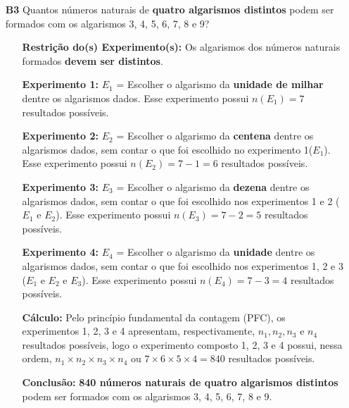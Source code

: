 \documentclass[a4paper,12pt]{article}
\begin{document}
\begin{enumerate}
\item[\textbf{B3}] Quantos números naturais de \textbf{quatro algarismos distintos} podem ser formados com os algarismos 3, 4, 5, 6, 7, 8 e 9?
 \begin{itemize}
     \item[\ding{172}] \textbf{Restrição do(s) Experimento(s):} Os algarismos dos números naturais formados \textbf{devem ser distintos}.
     \item[\ding{173}] \textbf{Experimento 1:} $E_1$ = Escolher o algarismo da \textbf{unidade de milhar} dentre os algarismos dados. Esse experimento possui $n(E_1) = 7$ resultados possíveis.
     \item[\ding{174}] \textbf{Experimento 2:} $E_2$ = Escolher o algarismo da \textbf{centena} dentre os algarismos dados, sem contar o que foi escolhido no experimento 1($E_1$). Esse experimento possui $n(E_2) = 7 - 1 = 6$ resultados possíveis.
     \item[\ding{175}] \textbf{Experimento 3:} $E_3$ = Escolher o algarismo da \textbf{dezena} dentre os algarismos dados, sem contar o que foi escolhido nos experimentos 1 e 2 ($E_1 \textrm{ e }E_2$). Esse experimento possui $n(E_3) = 7 - 2 = 5$ resultados possíveis.
     \item[\ding{176}] \textbf{Experimento 4:} $E_4$ = Escolher o algarismo da \textbf{unidade} dentre os algarismos dados, sem contar o que foi escolhido nos experimentos 1, 2 e 3 ($E_1 \textrm{ e } E_2 \textrm{ e } E_3$). Esse experimento possui $n(E_4) = 7 - 3 = 4$ resultados possíveis.    
     \item[\ding{177}] \textbf{Cálculo:} Pelo princípio fundamental da contagem (PFC), os experimentos 1, 2, 3 e 4 apresentam, respectivamente, $n_{1}, n_{2}, n_{3} \textrm{ e } n_{4}$ resultados possíveis, logo o experimento composto 1, 2, 3 e 4 possui, nessa ordem, $n_{1} \times n_{2} \times n_{3} \times n_{4}$ ou $7 \times 6 \times 5 \times 4 = 840$ resultados possíveis.
     \item[\ding{178}] \textbf{Conclusão:} \textbf{840 números naturais de quatro algarismos distintos} podem ser formados com os algarismos 3, 4, 5, 6, 7, 8 e 9. 
   \end{itemize}


\end{enumerate}
\end{document}
